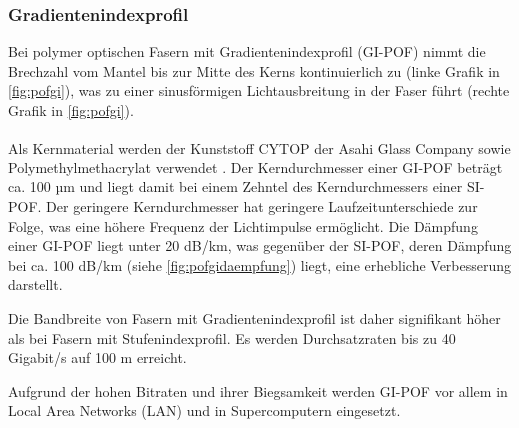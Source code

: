 \subsubsection{Gradientenindexprofil}

Bei polymer optischen Fasern mit Gradientenindexprofil (GI-POF) nimmt die
Brechzahl vom Mantel bis zur Mitte des Kerns kontinuierlich zu (linke Grafik in
\autoref{fig:pofgi}), was zu einer sinusförmigen Lichtausbreitung in der Faser
führt (rechte Grafik in \autoref{fig:pofgi}).

Als Kernmaterial werden der Kunststoff CYTOP\textsuperscript{\texttrademark} der
Asahi Glass Company sowie Polymethylmethacrylat verwendet \cite{pofacgif}. Der
Kerndurchmesser einer GI-POF beträgt ca. 100 µm und liegt damit bei einem
Zehntel des Kerndurchmessers einer SI-POF. Der geringere Kerndurchmesser hat
geringere Laufzeitunterschiede zur Folge, was eine höhere Frequenz der
Lichtimpulse ermöglicht. Die Dämpfung einer GI-POF liegt unter 20 dB/km, was
gegenüber der SI-POF, deren Dämpfung bei ca. 100 dB/km (siehe
\autoref{fig:pofgidaempfung}) liegt, eine erhebliche Verbesserung darstellt.

Die Bandbreite von Fasern mit Gradientenindexprofil ist daher signifikant höher
als bei Fasern mit Stufenindexprofil. Es werden Durchsatzraten bis zu 40
Gigabit/s auf 100 m erreicht.

Aufgrund der hohen Bitraten und ihrer Biegsamkeit werden GI-POF vor allem in
\glqq Local Area Networks\grqq{} (LAN) und in Supercomputern eingesetzt.
\cite{poflee}


